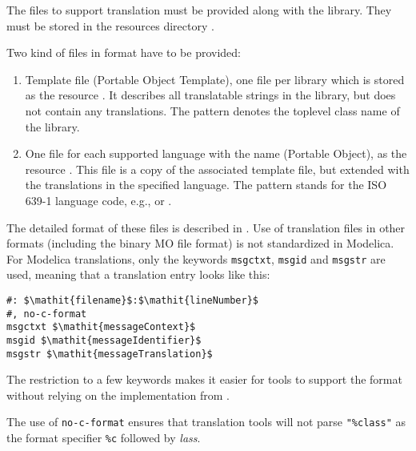 The files to support translation must be provided along with the library.
They must be stored in the resources directory .

Two kind of files in \textcite{GettextManual} format have to be provided:
\begin{enumerate}
\item Template file  (Portable Object Template), one file per library which is stored as the resource .
It describes all translatable strings in the library, but does not contain any translations.
The pattern  denotes the toplevel class name of the library.
\item One file for each supported language with the name  (Portable Object), as the resource .
This file is a copy of the associated template file, but extended with the translations in the specified language.
The pattern  stands for the ISO 639-1 language code, e.g.,  or .
\end{enumerate}

The detailed format of these files is described in \textcite{GettextManual}.
Use of translation files in other formats (including the binary MO file format) is not standardized in Modelica.
For Modelica translations, only the keywords \lstinline!msgctxt!, \lstinline!msgid! and \lstinline!msgstr! are used, meaning that a translation entry looks like this:
\begin{lstlisting}
#: $\mathit{filename}$:$\mathit{lineNumber}$
#, no-c-format
msgctxt $\mathit{messageContext}$
msgid $\mathit{messageIdentifier}$
msgstr $\mathit{messageTranslation}$
\end{lstlisting}
The restriction to a few keywords makes it easier for tools to support the format without relying on the implementation from \textcite{GettextManual}.

The use of \lstinline!no-c-format! ensures that translation tools will not parse \lstinline!"%class"! as the format specifier \lstinline!%c! followed by \emph{lass}.

